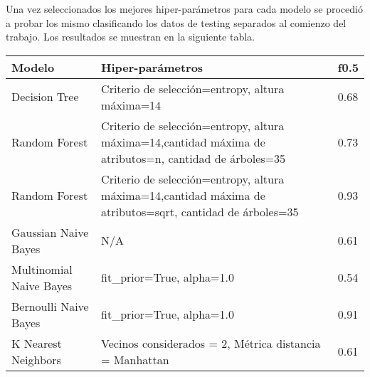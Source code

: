 Una vez seleccionados los mejores hiper-parámetros para cada modelo se procedió a probar los mismo clasificando los datos de testing separados al comienzo del trabajo.  Los resultados se muestran en la siguiente tabla. 
\begin{center}
    \begin{tabular}{ | l |  p{8cm} | l |}
    \hline
    \textbf{Modelo} & \textbf{Hiper-parámetros} & \textbf{f0.5} \\ \hline
Decision Tree & Criterio de selección=entropy, altura máxima=14 & 0.68  \\ \hline
 Random Forest & Criterio de selección=entropy, altura máxima=14,cantidad máxima de atributos=n, cantidad de árboles=35 & 0.73 \\ \hline
 Random Forest & Criterio de selección=entropy, altura máxima=14,cantidad máxima de atributos=sqrt, cantidad de árboles=35 & 0.93 \\ \hline
Gaussian Naive Bayes & N/A & 0.61 \\ \hline
Multinomial Naive Bayes & fit\_prior=True, alpha=1.0 & 0.54 \\ \hline
 Bernoulli Naive Bayes & fit\_prior=True, alpha=1.0 &  0.91 \\ \hline
K Nearest Neighbors & Vecinos considerados = 2, Métrica distancia =  Manhattan &   0.61 \\
    \hline
    \end{tabular}
\end{center}